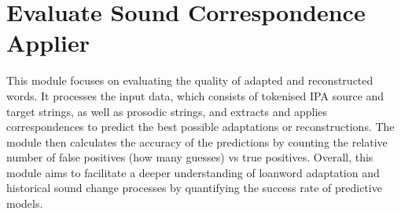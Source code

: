 \documentclass[letterpaper,10pt,english]{sphinxmanual}
\begin{document}
\section{Evaluate Sound Correspondence Applier}
\label{\detokenize{documentation:module-loanpy.eval_sca}}\label{\detokenize{documentation:evaluate-sound-correspondence-applier}}
\sphinxAtStartPar
This module focuses on evaluating the quality of adapted and reconstructed
words. It processes the input data,
which consists of tokenised IPA source and target strings, as well as
prosodic strings, and extracts and applies correspondences to predict the best
possible adaptations or reconstructions. The module then
calculates the accuracy of the predictions by counting the relative number of
false positives (how many guesses) vs true positives.
Overall, this module aims to facilitate a deeper understanding of
loanword adaptation and historical sound change processes
by quantifying the success rate of predictive models.
\end{document}
